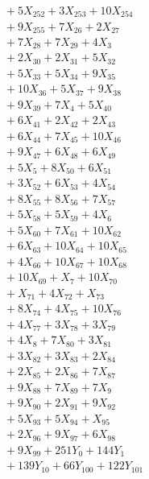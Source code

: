 \documentclass[a4paper,10pt]{article}
\begin{document}
{\begin{align}
&\quad  + 5X_{252} + 3X_{253} + 10X_{254} \\[0.5ex]
&\quad  + 9X_{255} + 7X_{26} + 2X_{27} \\[0.5ex]
&\quad  + 7X_{28} + 7X_{29} + 4X_{3} \\[0.5ex]
&\quad  + 2X_{30} + 2X_{31} + 5X_{32} \\[0.5ex]
&\quad  + 5X_{33} + 5X_{34} + 9X_{35} \\[0.5ex]
&\quad  + 10X_{36} + 5X_{37} + 9X_{38} \\[0.5ex]
&\quad  + 9X_{39} + 7X_{4} + 5X_{40} \\[0.5ex]
&\quad  + 6X_{41} + 2X_{42} + 2X_{43} \\[0.5ex]
&\quad  + 6X_{44} + 7X_{45} + 10X_{46} \\[0.5ex]
&\quad  + 9X_{47} + 6X_{48} + 6X_{49} \\[0.5ex]
&\quad  + 5X_{5} + 8X_{50} + 6X_{51} \\[0.5ex]
&\quad  + 3X_{52} + 6X_{53} + 4X_{54} \\[0.5ex]
&\quad  + 8X_{55} + 8X_{56} + 7X_{57} \\[0.5ex]
&\quad  + 5X_{58} + 5X_{59} + 4X_{6} \\[0.5ex]
&\quad  + 5X_{60} + 7X_{61} + 10X_{62} \\[0.5ex]
&\quad  + 6X_{63} + 10X_{64} + 10X_{65} \\[0.5ex]
&\quad  + 4X_{66} + 10X_{67} + 10X_{68} \\[0.5ex]
&\quad  + 10X_{69} + X_{7} + 10X_{70} \\[0.5ex]
&\quad  + X_{71} + 4X_{72} + X_{73} \\[0.5ex]
&\quad  + 8X_{74} + 4X_{75} + 10X_{76} \\[0.5ex]
&\quad  + 4X_{77} + 3X_{78} + 3X_{79} \\[0.5ex]
&\quad  + 4X_{8} + 7X_{80} + 3X_{81} \\[0.5ex]
&\quad  + 3X_{82} + 3X_{83} + 2X_{84} \\[0.5ex]
&\quad  + 2X_{85} + 2X_{86} + 7X_{87} \\[0.5ex]
&\quad  + 9X_{88} + 7X_{89} + 7X_{9} \\[0.5ex]
&\quad  + 9X_{90} + 2X_{91} + 9X_{92} \\[0.5ex]
&\quad  + 5X_{93} + 5X_{94} + X_{95} \\[0.5ex]
&\quad  + 2X_{96} + 9X_{97} + 6X_{98} \\[0.5ex]
&\quad  + 9X_{99} + 251Y_{0} + 144Y_{1} \\[0.5ex]
&\quad  + 139Y_{10} + 66Y_{100} + 122Y_{101} \\[0.5ex]

\end{align}}
\end{document}
